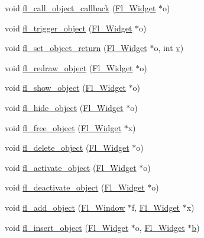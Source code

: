 \begin{DoxyCompactItemize}
\item 
void \hyperlink{forms_8_h_a909a8cbb92d1a91883701f3aaef4614f}{fl\+\_\+call\+\_\+object\+\_\+callback} (\hyperlink{class_fl___widget}{Fl\+\_\+\+Widget} $\ast$o)
\item 
void \hyperlink{forms_8_h_a1160014c2f397c7ca09f6387c4f6f51e}{fl\+\_\+trigger\+\_\+object} (\hyperlink{class_fl___widget}{Fl\+\_\+\+Widget} $\ast$o)
\item 
void \hyperlink{forms_8_h_a741091224a74222dfc0e18b64bcb5f1e}{fl\+\_\+set\+\_\+object\+\_\+return} (\hyperlink{class_fl___widget}{Fl\+\_\+\+Widget} $\ast$o, int \hyperlink{forms_8_h_a3b90d5a73541ab9402511d87bed076ef}{v})
\item 
void \hyperlink{forms_8_h_a8dff28929b6a54a97d5a8ad840f2d777}{fl\+\_\+redraw\+\_\+object} (\hyperlink{class_fl___widget}{Fl\+\_\+\+Widget} $\ast$o)
\item 
void \hyperlink{forms_8_h_a24ae0d1af80df0af244d3bdba925b877}{fl\+\_\+show\+\_\+object} (\hyperlink{class_fl___widget}{Fl\+\_\+\+Widget} $\ast$o)
\item 
void \hyperlink{forms_8_h_a2c0efa35a0e3e305fbfecfe9160c0e76}{fl\+\_\+hide\+\_\+object} (\hyperlink{class_fl___widget}{Fl\+\_\+\+Widget} $\ast$o)
\item 
void \hyperlink{forms_8_h_a42b2e33ff6400b99167e203d3e9d2ff7}{fl\+\_\+free\+\_\+object} (\hyperlink{class_fl___widget}{Fl\+\_\+\+Widget} $\ast$x)
\item 
void \hyperlink{forms_8_h_a07217b6c942c2f04f5410544f64d7804}{fl\+\_\+delete\+\_\+object} (\hyperlink{class_fl___widget}{Fl\+\_\+\+Widget} $\ast$o)
\item 
void \hyperlink{forms_8_h_a6332a5e0e6a8d091632a82ac307c0b87}{fl\+\_\+activate\+\_\+object} (\hyperlink{class_fl___widget}{Fl\+\_\+\+Widget} $\ast$o)
\item 
void \hyperlink{forms_8_h_a0f927d26f152d7412088f39f96a31138}{fl\+\_\+deactivate\+\_\+object} (\hyperlink{class_fl___widget}{Fl\+\_\+\+Widget} $\ast$o)
\item 
void \hyperlink{forms_8_h_ab099cab7dc17b8cbc30b8c8e3a47da10}{fl\+\_\+add\+\_\+object} (\hyperlink{class_fl___window}{Fl\+\_\+\+Window} $\ast$f, \hyperlink{class_fl___widget}{Fl\+\_\+\+Widget} $\ast$x)
\item 
void \hyperlink{forms_8_h_a044f82605076d6225f77ea63770af0db}{fl\+\_\+insert\+\_\+object} (\hyperlink{class_fl___widget}{Fl\+\_\+\+Widget} $\ast$o, \hyperlink{class_fl___widget}{Fl\+\_\+\+Widget} $\ast$\hyperlink{forms_8_h_a0ba06a290a384fa06b1b90745827dae2}{b})
\item 

\end{DoxyCompactItemize}
